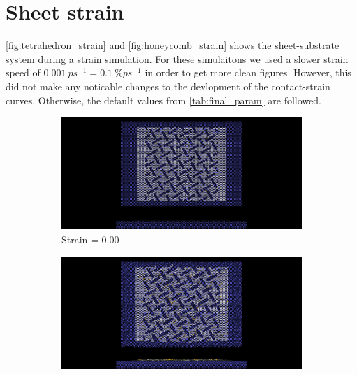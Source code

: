 \section{Sheet strain}\label{sec:sheet_stretch}

\cref{fig:tetrahedron_strain} and \cref{fig:honeycomb_strain} shows the sheet-substrate system during a strain simulation. For these simulaitons we used a slower strain speed of $\SI{0.001}{ps^{-1}} = \SI{0.1}{\%ps^{-1}}$ in order to get more clean figures. However, this did not make any noticable changes to the devlopment of the contact-strain curves. Otherwise, the default values from \cref{tab:final_param} are followed.


\newpage



\begin{figure}[H]
    \centering
    \begin{subfigure}[b]{0.49\textwidth}
        \centering
        \includegraphics[width=\textwidth]{figures/baseline/contact_vs_stretch/popup/pop_stretch0000.png}
        \caption{Strain = 0.00}
    \end{subfigure}
    \hfill
    \begin{subfigure}[b]{0.49\textwidth}
        \centering
        \includegraphics[width=\textwidth]{figures/baseline/contact_vs_stretch/popup/pop_stretch0006.png}

\end{subfigure}
\end{figure}
